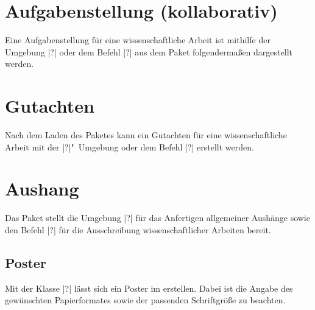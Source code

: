 \begin{Bundle}{}
\section{Aufgabenstellung (kollaborativ)}
%
%
%
%
Eine Aufgabenstellung für eine wissenschaftliche Arbeit ist mithilfe der 
Umgebung |?| oder dem Befehl |?| aus dem 
Paket  folgendermaßen dargestellt werden.

\section{Gutachten}
%
%
%
Nach dem Laden des Paketes  kann ein Gutachten für 
eine wissenschaftliche Arbeit mit der |?|"~Umgebung 
oder dem Befehl |?| erstellt werden.

\section{Aushang}
%
%
%
Das Paket  stellt die Umgebung |?|
für das Anfertigen allgemeiner Aushänge sowie den Befehl |?|
für die Ausschreibung wissenschaftlicher Arbeiten bereit.
\end{Bundle}

\begin{Bundle}{}
\section{Poster}
%
%
%
Mit der Klasse |?| lässt sich ein Poster im \TUDCD 
erstellen. Dabei ist die Angabe des gewünschten Papierformates sowie der 
passenden Schriftgröße zu beachten.
%
\end{Bundle}




